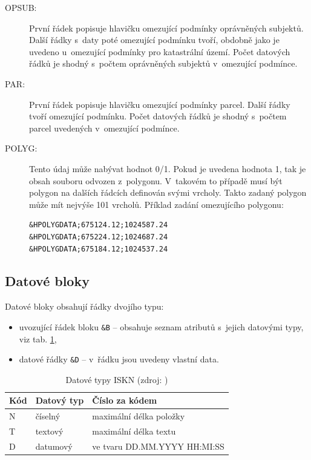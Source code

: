\documentclass[a4paper,12pt,oneside]{book}
\begin{document}
\begin{description}
\item[OPSUB:] První řádek popisuje hlavičku omezující podmínky
  oprávněných subjektů. Další řádky s~daty poté omezující podmínku
  tvoří, obdobně jako je uvedeno u~omezující podmínky pro katastrální
  území. Počet datových řádků je shodný s~počtem oprávněných subjektů
  v~omezující podmínce.
 
\item[PAR:] První řádek popisuje hlavičku omezující podmínky
  parcel. Další řádky tvoří omezující podmínku. Počet datových řádků
  je shodný s~počtem parcel uvedených v~omezující podmínce.
 
\item[POLYG:] Tento údaj může nabývat hodnot 0/1. Pokud je uvedena
  hodnota 1, tak je obsah souboru odvozen z~polygonu. V~takovém to
  případě musí být polygon na dalších řádcích definován svými
  vrcholy. Takto zadaný polygon může mít nejvýše 101 vrcholů. Příklad
  zadání omezujícího polygonu:
 
 \begin{lstlisting}
&HPOLYGDATA;675124.12;1024587.24
&HPOLYGDATA;675224.12;1024687.24
&HPOLYGDATA;675184.12;1024537.24
 \end{lstlisting} 
\end{description}

\subsection{Datové bloky}

Datové bloky obsahují řádky dvojího typu:

\begin{itemize}
\item uvozující řádek bloku \texttt{\&B} -- obsahuje seznam atributů
  s~jejich datovými typy, viz tab. \ref{t_datove_typy},
 \item datové řádky \texttt{\&D} -- v~řádku jsou uvedeny vlastní data.
\end{itemize}

\begin{table}[htbp]
\centering
\caption[Datové typy ISKN]{Datové typy ISKN (zdroj: \cite{dp_landa})}
\begin{tabular}{lll}
\toprule
\textbf{Kód} & \textbf{Datový typ} & \textbf{Číslo za kódem} \\ 
\midrule
N & číselný & maximální délka položky \\ 
T & textový & maximální délka textu \\ 
D & datumový & ve tvaru DD.MM.YYYY HH:MI:SS \\ 
\bottomrule
\end{tabular}
\label{t_datove_typy}
\end{table}
\end{document}
